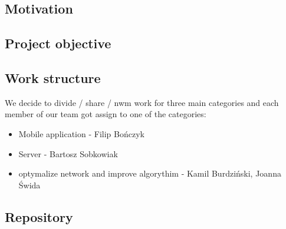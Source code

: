 \documentclass[../Main.tex]{subfiles}
\begin{document}
\subsection{Motivation}

\lipsum[10] %

\subsection{Project objective}

\lipsum[15] %

\subsection{Work structure}

We decide to divide / share / nwm work for three main categories and each member of our team got assign to one of the categories: 
\begin{itemize}
    \item Mobile application - Filip Bończyk
    \item Server - Bartosz Sobkowiak
    \item optymalize network and improve algorythim - Kamil Burdziński, Joanna Świda
\end{itemize}

\subsection{Repository}


\biblio %
\end{document}
